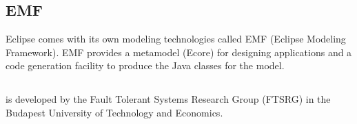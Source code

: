 \subsection{EMF}
\label{subsec:EMF}

Eclipse comes with its own modeling technologies called EMF (Eclipse Modeling Framework). EMF provides a metamodel (Ecore) for designing applications and a code generation facility to produce the Java classes for the model.

\subsection{\eiq}

\eiq is developed by the Fault Tolerant Systems Research Group (FTSRG) in the Budapest University of Technology and Economics. 


